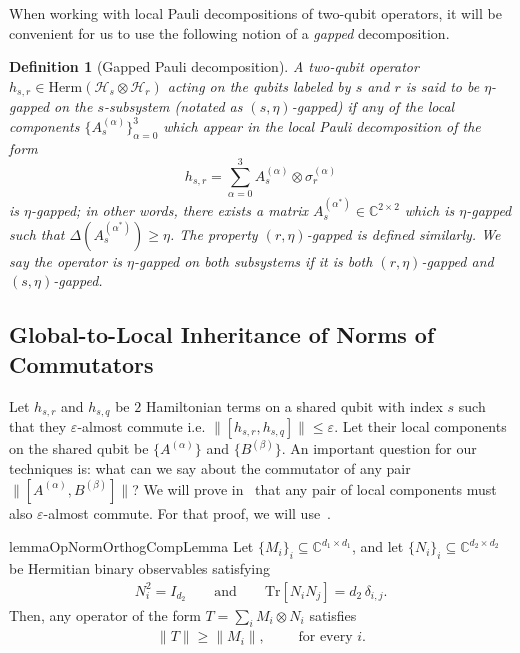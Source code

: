 \documentclass[11pt]{article}
\theoremstyle{plain}
\newtheorem{definition}[theorem]{Definition}
\newcommand{\eps}{\varepsilon}
\begin{document}
When working with local Pauli decompositions of two-qubit operators, it will be convenient for us to use the following notion of a \emph{gapped} decomposition.
\begin{definition}[Gapped Pauli decomposition]\label{def:gapped-pauli-decomp}
  A two-qubit operator $h_{s,r} \in \mathrm{Herm}(\mathcal{H}_s \otimes \mathcal{H}_r)$ acting on the qubits labeled by $s$ and $r$ is said to be $\eta$-gapped on the $s$-subsystem (notated as $(s, \eta)$-gapped) if any of the local components $\{A_s^{(\alpha)}\}_{\alpha=0}^3$ which appear in the local Pauli decomposition of the form
      \begin{equation}
        h_{s,r} = \sum\limits_{\alpha = 0}^{3} A_s^{(\alpha)} \otimes \sigma_r^{(\alpha)}
    \end{equation}
  is $\eta$-gapped; in other words, there exists a matrix $A_s^{(\alpha^*)} \in \mathbb{C}^{2 \times 2}$ which is $\eta$-gapped such that $\Delta(A_s^{(\alpha^*)}) \geq \eta$.
    The property $\left(r, \eta\right)$-gapped is defined similarly. We say the operator is $\eta$-gapped on both subsystems if it is both $\left(r, \eta\right)$-gapped and $\left(s, \eta\right)$-gapped.
\end{definition}

\subsection{Global-to-Local Inheritance of Norms of Commutators}
Let $h_{s,r}$ and $h_{s,q}$ be $2$ Hamiltonian terms on a shared qubit with index $s$ such that they $\eps$-almost commute i.e. $\|[h_{s,r}, h_{s,q}]\| \leq \eps$. Let their local components on the shared qubit be $\{A^{(\alpha)}\}$ and $\{B^{(\beta)}\}$. An important question for our techniques is: what can we say about the commutator of any pair $\|[A^{(\alpha)}, B^{(\beta)}]\|$? We will prove in~ that any pair of local components must also $\eps$-almost commute. For that proof, we will use~.

\begin{restatable}{lemma}{OpNormOrthogCompLemma}
\label{lem:opnorm-orthog-components}
Let $\{M_i\}_i \subseteq \mathbb{C}^{d_1 \times d_1}$, and let
$\{N_i\}_i \subseteq \mathbb{C}^{d_2 \times d_2}$ be Hermitian binary
observables satisfying
\begin{align}
    N_i^2 = I_{d_2}
    \qquad \text{and} \qquad
    \mathrm{Tr}[N_i N_j] = d_2\,\delta_{i,j}.
\end{align}
Then, any operator of the form
$T = \sum_i M_i \otimes N_i$ satisfies
\begin{align}
    \|T\| \geq \|M_i\|, \qquad \text{ for every $i$.}
\end{align}
\end{restatable}
\end{document}
